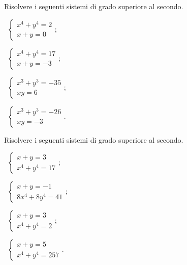\begin{esercizio}[\Ast]
 \label{ese:6.28}
Risolvere i seguenti sistemi di grado superiore al secondo.
\begin{multicols}{2}
 \begin{enumeratea}
 \item~$\left\{\begin{array}{l}x^4+y^4=2\\x+y=0\end{array}\right.$;
 \item~$\left\{\begin{array}{l}x^4+y^4=17\\x+y=-3\end{array}\right.$;
 \item~$\left\{\begin{array}{l}x^3+y^3=-35\\xy=6\end{array}\right.$;
 \item~$\left\{\begin{array}{l}x^3+y^3=-26\\xy=-3\end{array}\right.$.
 \end{enumeratea}
 \end{multicols}
\end{esercizio}

\begin{esercizio}[\Ast]
 \label{ese:6.29}
Risolvere i seguenti sistemi di grado superiore al secondo.
\begin{multicols}{2}
 \begin{enumeratea}
 \item~$\left\{\begin{array}{l}{x+y=3}\\{x^4+y^4=17}\end{array}\right.$;
 \item~$\left\{\begin{array}{l}{x+y=-1}\\{8x^4+8y^4=41}\end{array}\right.$;
 \item~$\left\{\begin{array}{l}{x+y=3}\\{x^4+y^4=2}\end{array}\right.$;
 \item~$\left\{\begin{array}{l}{x+y=5}\\{x^4+y^4=257}\end{array}\right.$.
 \end{enumeratea}
 \end{multicols}
\end{esercizio}

